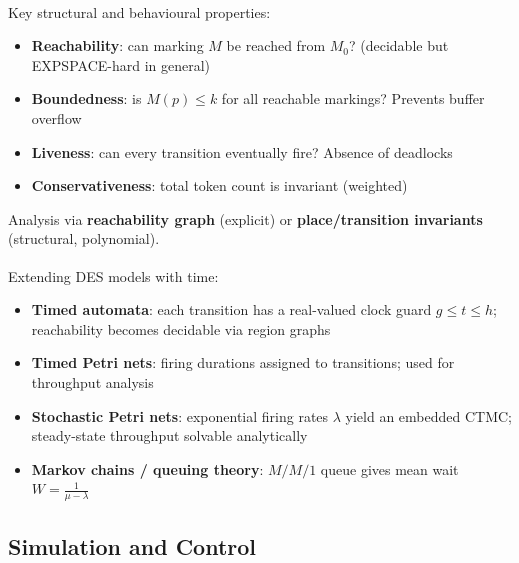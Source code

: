 \begin{tcbitemize}[ skin=sectionraster ]
    \tcbitem[title={Petri Net Properties and Analysis}, raster multicolumn=3]
    Key structural and behavioural properties\textsuperscript{\cite[][pp.~40--80]{reisigUnderstandingPetriNets2013}}:
    \begin{itemize}
        \item \textbf{Reachability}: can marking $M$ be reached from $M_0$? (decidable but EXPSPACE-hard in general)
        \item \textbf{Boundedness}: is $M(p) \leq k$ for all reachable markings? Prevents buffer overflow
        \item \textbf{Liveness}: can every transition eventually fire? Absence of deadlocks
        \item \textbf{Conservativeness}: total token count is invariant (weighted)
    \end{itemize}
    Analysis via \textbf{reachability graph} (explicit) or \textbf{place/transition invariants} (structural, polynomial).

    \tcbitem[title={Timed and Stochastic Models}, raster multicolumn=3]
    Extending DES models with time\textsuperscript{\cite[][pp.~250--280]{cassandrasIntroductionDiscreteEvent2009}}:
    \begin{itemize}
        \item \textbf{Timed automata}: each transition has a real-valued clock guard $g \leq t \leq h$; reachability becomes decidable via region graphs
        \item \textbf{Timed Petri nets}: firing durations assigned to transitions; used for throughput analysis
        \item \textbf{Stochastic Petri nets}: exponential firing rates $\lambda$ yield an embedded CTMC; steady-state throughput solvable analytically
        \item \textbf{Markov chains / queuing theory}: $M/M/1$ queue gives mean wait $W = \frac{1}{\mu - \lambda}$
    \end{itemize}
\end{tcbitemize}

\subsection{Simulation and Control}

